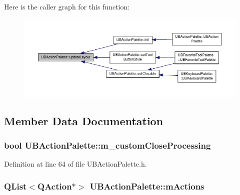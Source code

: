 Here is the caller graph for this function\-:
\nopagebreak
\begin{figure}[H]
\begin{center}
\leavevmode
\includegraphics[width=350pt]{de/dc5/class_u_b_action_palette_ab1b868f86b28c9896cc12bba932fecc2_icgraph}
\end{center}
\end{figure}




\subsection{Member Data Documentation}
\hypertarget{class_u_b_action_palette_a7607d893e16a6623a3bc10a049acbdc0}{
\subsubsection[{m\-\_\-custom\-Close\-Processing}]{\setlength{\rightskip}{0pt plus 5cm}bool U\-B\-Action\-Palette\-::m\-\_\-custom\-Close\-Processing}}\label{de/dc5/class_u_b_action_palette_a7607d893e16a6623a3bc10a049acbdc0}


Definition at line 64 of file U\-B\-Action\-Palette.\-h.

\hypertarget{class_u_b_action_palette_a5c4efb6a44c5e95f151c9ab00cdd57f7}{
\subsubsection[{m\-Actions}]{\setlength{\rightskip}{0pt plus 5cm}Q\-List$<$Q\-Action$\ast$$>$ U\-B\-Action\-Palette\-::m\-Actions\hspace{0.3cm}{\ttfamily [protected]}}}\label{de/dc5/class_u_b_action_palette_a5c4efb6a44c5e95f151c9ab00cdd57f7}


